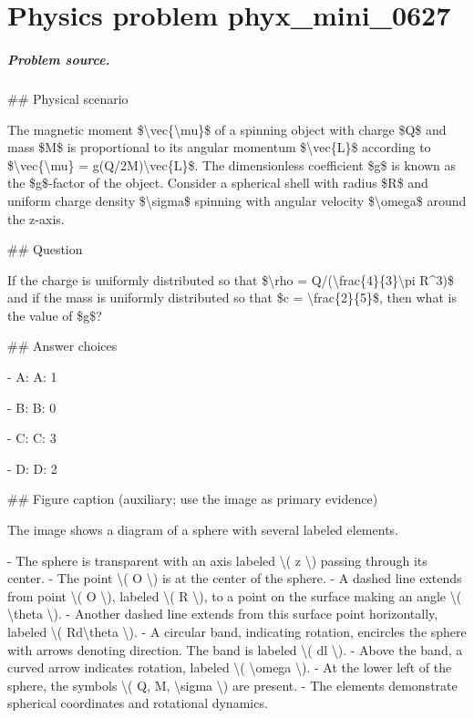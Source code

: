 
\chapter{Physics problem phyx\_mini\_0627}
\label{ch:PhyXMiniProblems_problem_phyx_mini_0627}

\paragraph{Problem source.}
\#\# Physical scenario

The magnetic moment \$\textbackslash{}vec\{\textbackslash{}mu\}\$ of a spinning object with charge \$Q\$ and mass \$M\$ is proportional to its angular momentum \$\textbackslash{}vec\{L\}\$ according to \$\textbackslash{}vec\{\textbackslash{}mu\} = g(Q/2M)\textbackslash{}vec\{L\}\$. The dimensionless coefficient \$g\$ is known as the \$g\$-factor of the object. Consider a spherical shell with radius \$R\$ and uniform charge density \$\textbackslash{}sigma\$ spinning with angular velocity \$\textbackslash{}omega\$ around the z-axis.

\#\# Question

If the charge is uniformly distributed so that \$\textbackslash{}rho = Q/(\textbackslash{}frac\{4\}\{3\}\textbackslash{}pi R\textasciicircum{}3)\$ and if the mass is uniformly distributed so that \$c = \textbackslash{}frac\{2\}\{5\}\$, then what is the value of \$g\$?

\#\# Answer choices

- A: A: 1

- B: B: 0

- C: C: 3

- D: D: 2

\#\# Figure caption (auxiliary; use the image as primary evidence)

The image shows a diagram of a sphere with several labeled elements. 

- The sphere is transparent with an axis labeled \textbackslash{}( z \textbackslash{}) passing through its center.
- The point \textbackslash{}( O \textbackslash{}) is at the center of the sphere.
- A dashed line extends from point \textbackslash{}( O \textbackslash{}), labeled \textbackslash{}( R \textbackslash{}), to a point on the surface making an angle \textbackslash{}( \textbackslash{}theta \textbackslash{}).
- Another dashed line extends from this surface point horizontally, labeled \textbackslash{}( Rd\textbackslash{}theta \textbackslash{}).
- A circular band, indicating rotation, encircles the sphere with arrows denoting direction. The band is labeled \textbackslash{}( dl \textbackslash{}).
- Above the band, a curved arrow indicates rotation, labeled \textbackslash{}( \textbackslash{}omega \textbackslash{}).
- At the lower left of the sphere, the symbols \textbackslash{}( Q, M, \textbackslash{}sigma \textbackslash{}) are present.
- The elements demonstrate spherical coordinates and rotational dynamics.

